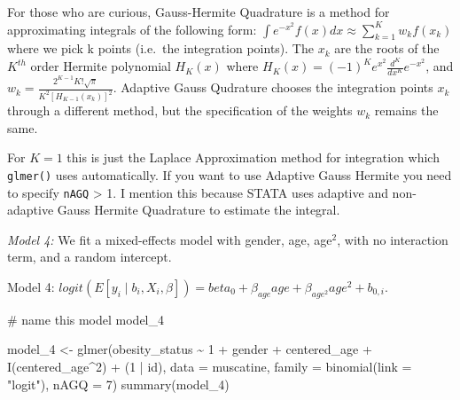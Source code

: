 \documentclass[
  letterpaper,
  DIV=11,
  numbers=noendperiod]{scrreprt}
\newenvironment{Shaded}{\begin{snugshade}}{\end{snugshade}}
\newcommand{\AttributeTok}[1]{\textcolor[rgb]{0.40,0.45,0.13}{#1}}
\newcommand{\CommentTok}[1]{\textcolor[rgb]{0.37,0.37,0.37}{#1}}
\newcommand{\DecValTok}[1]{\textcolor[rgb]{0.68,0.00,0.00}{#1}}
\newcommand{\FunctionTok}[1]{\textcolor[rgb]{0.28,0.35,0.67}{#1}}
\newcommand{\NormalTok}[1]{\textcolor[rgb]{0.00,0.23,0.31}{#1}}
\newcommand{\OtherTok}[1]{\textcolor[rgb]{0.00,0.23,0.31}{#1}}
\newcommand{\SpecialCharTok}[1]{\textcolor[rgb]{0.37,0.37,0.37}{#1}}
\newcommand{\StringTok}[1]{\textcolor[rgb]{0.13,0.47,0.30}{#1}}
\begin{document}
For those who are curious, Gauss-Hermite Quadrature is a method for
approximating integrals of the following form:
\(\int e^{-x^2} f(x)dx \approx \sum^K_{k=1}w_k f(x_k)\) where we pick k
points (i.e.~the integration points). The \(x_k\) are the roots of the
\(K^{th}\) order Hermite polynomial \(H_K(x)\) where
\(H_K(x) = (-1)^K e^{x^2} \frac{d^K}{dx^K}e^{-x^2}\), and
\(w_k = \frac{2^{K-1}K!\sqrt{\pi}}{K^2[H_{K-1}(x_k)]^2}\). Adaptive
Gauss Qudrature chooses the integration points \(x_k\) through a
different method, but the specification of the weights \(w_k\) remains
the same.

For \(K=1\) this is just the Laplace Approximation method for
integration which \texttt{glmer()} uses automatically. If you want to
use Adaptive Gauss Hermite you need to specify \texttt{nAGQ}
\textgreater{} 1. I mention this because STATA uses adaptive and
non-adaptive Gauss Hermite Quadrature to estimate the integral.

\emph{Model 4:} We fit a mixed-effects model with gender, age,
age\(^2\), with no interaction term, and a random intercept.

Model 4:
\(logit(E[y_{i} \mid b_i, X_i, \beta]) = beta_{0} + \beta_{age}age + \beta_{age^2}age^2 + b_{0,i}\).

\begin{Shaded}
\begin{Highlighting}[]
\CommentTok{\# name this model \textquotesingle{}model\_4\textquotesingle{}}

\NormalTok{model\_4 }\OtherTok{\textless{}{-}} \FunctionTok{glmer}\NormalTok{(obesity\_status }\SpecialCharTok{\textasciitilde{}} \DecValTok{1} \SpecialCharTok{+}\NormalTok{ gender }\SpecialCharTok{+}\NormalTok{ centered\_age }\SpecialCharTok{+} \FunctionTok{I}\NormalTok{(centered\_age}\SpecialCharTok{\^{}}\DecValTok{2}\NormalTok{) }\SpecialCharTok{+}
\NormalTok{    (}\DecValTok{1} \SpecialCharTok{|}\NormalTok{ id), }\AttributeTok{data =}\NormalTok{ muscatine, }\AttributeTok{family =} \FunctionTok{binomial}\NormalTok{(}\AttributeTok{link =} \StringTok{"logit"}\NormalTok{), }\AttributeTok{nAGQ =} \DecValTok{7}\NormalTok{)}
\FunctionTok{summary}\NormalTok{(model\_4)}
\end{Highlighting}
\end{Shaded}
\end{document}
